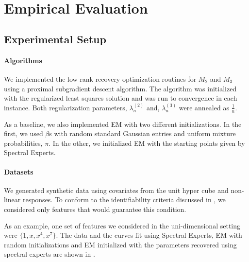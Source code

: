 \section{Empirical Evaluation}
\label{sec:evaluation}


\subsection{Experimental Setup}

\paragraph{Algorithms}

We implemented the low rank recovery optimization routines for $M_2$ and
$M_3$ using a proximal subgradient descent algorithm\citationneeded. The
algorithm was initialized with the regularized least squares solution
and was run to convergence in each instance. Both regularization
parameters, $\lambda_n^{(2)}$ and, $\lambda_n^{(3)}$ were annealed as
$\frac{1}{n}$. 

As a baseline, we also implemented EM with two different
initializations. In the first, we used $\beta$s with random standard
Gaussian entries and uniform mixture probabilities, $\pi$. In the other,
we initialized EM with the starting points given by Spectral Experts. 

\paragraph{Datasets}

We generated synthetic data using covariates from the unit hyper cube
and non-linear responses.  To conform to the identifiability criteria
discussed in , we considered only features that
would guarantee this condition. 

As an example, one set of features we considered in the uni-dimensional
setting were $\{1, x, x^4, x^7\}$. The data and the curves fit using
Spectral Experts, EM with random initializations and EM initialized with
the parameters recovered using spectral experts are shown in
.

